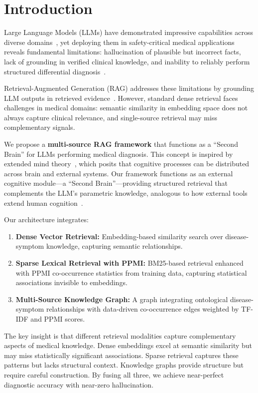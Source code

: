 \documentclass[preprint,12pt]{elsarticle}
\begin{document}
\section{Introduction}
\label{sec:introduction}

Large Language Models (LLMs) have demonstrated impressive capabilities across diverse domains~\cite{brown2020language,openai2023gpt4}, yet deploying them in safety-critical medical applications reveals fundamental limitations: hallucination of plausible but incorrect facts, lack of grounding in verified clinical knowledge, and inability to reliably perform structured differential diagnosis~\cite{ji2023survey,singhal2023large}.

Retrieval-Augmented Generation (RAG) addresses these limitations by grounding LLM outputs in retrieved evidence~\cite{lewis2020retrieval,gao2023retrieval}. However, standard dense retrieval faces challenges in medical domains: semantic similarity in embedding space does not always capture clinical relevance, and single-source retrieval may miss complementary signals. 

We propose a \textbf{multi-source RAG framework} that functions as a ``Second Brain'' for LLMs performing medical diagnosis. This concept is inspired by extended mind theory~\cite{clark1998extended}, which posits that cognitive processes can be distributed across brain and external systems. Our framework functions as an external cognitive module—a ``Second Brain''—providing structured retrieval that complements the LLM's parametric knowledge, analogous to how external tools extend human cognition~\cite{hutchins1995cognition}.

Our architecture integrates:

\begin{enumerate}
    \item \textbf{Dense Vector Retrieval:} Embedding-based similarity search over disease-symptom knowledge, capturing semantic relationships.
    \item \textbf{Sparse Lexical Retrieval with PPMI:} BM25-based retrieval enhanced with PPMI co-occurrence statistics from training data, capturing statistical associations invisible to embeddings.
    \item \textbf{Multi-Source Knowledge Graph:} A graph integrating ontological disease-symptom relationships with data-driven co-occurrence edges weighted by TF-IDF and PPMI scores.
\end{enumerate}

The key insight is that different retrieval modalities capture complementary aspects of medical knowledge. Dense embeddings excel at semantic similarity but may miss statistically significant associations. Sparse retrieval captures these patterns but lacks structural context. Knowledge graphs provide structure but require careful construction. By fusing all three, we achieve near-perfect diagnostic accuracy with near-zero hallucination.
\end{document}

